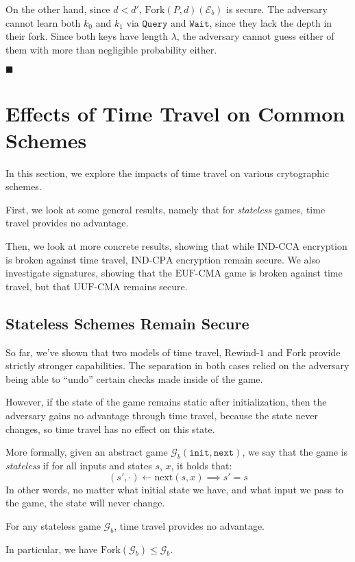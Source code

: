 On the other hand, since $d < d'$, $\text{Fork}(P, d)(\mathcal{E}_b)$
is secure.
The adversary cannot learn both $k_0$ and $k_1$ via $\texttt{Query}$
and $\texttt{Wait}$, since they lack the depth in their fork.
Since both keys have length $\lambda$, the adversary cannot guess
either of them with more than negligible probability either.


$\blacksquare$

\section{Effects of Time Travel on Common Schemes}
\label{sec:effect}

In this section, we explore the impacts of time travel on various
crytographic schemes.

First, we look at some general results, namely that for \emph{stateless}
games, time travel provides no advantage.

Then, we look at more concrete results, showing that while $\text{IND-CCA}$
encryption is broken against time travel, $\text{IND-CPA}$ encryption
remain secure.
We also investigate signatures, showing that the $\text{EUF-CMA}$
game is broken against time travel, but that $\text{UUF-CMA}$ remains secure.

\subsection{Stateless Schemes Remain Secure}

So far, we've shown that two models of time travel, $\text{Rewind-1}$
and $\text{Fork}$ provide strictly stronger capabilities.
The separation in both cases relied on the adversary being able to
``undo'' certain checks made inside of the game.

However, if the state of the game remains static after initialization,
then the adversary gains no advantage through time travel,
because the state never changes, so time travel has no effect on this
state.

More formally, given an abstract game $\mathcal{G}_b(\texttt{init}, \texttt{next})$,
we say that the game is \emph{stateless} if for all inputs and states $s$, $x$, it holds that:
$$
(s', \cdot) \gets \text{next}(s, x) \implies s' = s
$$
In other words, no matter what initial state we have, and what input
we pass to the game, the state will never change.

\begin{claim}
\label{claim:stateless-games}
For any stateless game $\mathcal{G}_b$, time travel provides no advantage.

In particular, we have $\text{Fork}(\mathcal{G}_b) \leq \mathcal{G}_b$.
\end{claim}

